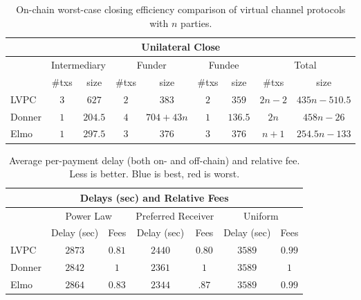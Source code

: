   \begin{table}[h!]
    \begin{minipage}{\textwidth}
    \centering
    \begin{tabular}{|l|c|c|c|c|c|c|c|c|}
    \hline
    \multicolumn{9}{|c|}{Unilateral Close} \\
    \hline
              & \multicolumn{2}{|c|}{Intermediary}
              & \multicolumn{2}{|c|}{Funder} & \multicolumn{2}{|c|}{Fundee}
              & \multicolumn{2}{|c|}{Total} \\
    \hline
              & \#txs & size & \#txs & size & \#txs & size & \#txs & size \\
    \hline
    LVPC      & $3$ & $627$ & $2$ & $383$ & $2$ & $359$ & $2n-2$ & $435n -
              510.5$ \\
    \hline
    Donner    & $1$ & $204.5$ & $4$ & $704 + 43n$ & $1$ & $136.5$ & $2n$ & $458n
              - 26$ \\
    \hline
    Elmo      & $1$ & $297.5$ & $3$ & $376$ & $3$ & $376$
              & $n+1$ & $254.5n-133$ \\
    \hline
    \end{tabular}
    \end{minipage}
    \caption{On-chain worst-case closing efficiency comparison of virtual
    channel protocols with $n$ parties.}
    \label{table:comparison:overhead:n-parties:close}
  \end{table}

  \begin{table}[h!]
    \begin{minipage}{\textwidth}
    \centering
    \begin{tabular}{|l|c|c|c|c|c|c|}
    \hline
    \multicolumn{7}{|c|}{Delays (sec) and Relative Fees} \\
    \hline
        & \multicolumn{2}{|c|}{Power Law}
        & \multicolumn{2}{|c|}{Preferred Receiver}
        & \multicolumn{2}{|c|}{Uniform} \\
    \hline
        & Delay (sec) & Fees & Delay (sec) & Fees & Delay (sec) & Fees \\
    \hline
    LVPC & {\color{red}$2873$} & {\color{blue}$0.81$} & {\color{red}$2440$} & {\color{blue}$0.80$} & {\color{blue}$3589$} & {\color{blue}$0.99$} \\
    \hline
    Donner & {\color{blue}$2842$} & {\color{red}$1$} & $2361$ & {\color{red}$1$} & {\color{blue}$3589$} & {\color{red}$1$} \\
    \hline
    Elmo & $2864$ & $0.83$ & {\color{blue}$2344$} & $.87$ & {\color{blue}$3589$} & {\color{blue}$0.99$} \\
    \hline
    \end{tabular}
    \end{minipage}
      \caption{Average per-payment delay (both on- and off-chain) and relative
      fee. Less is better. {\color{blue}Blue} is best, {\color{red}red} is
      worst.}
      \label{table:performance}
  \end{table}


